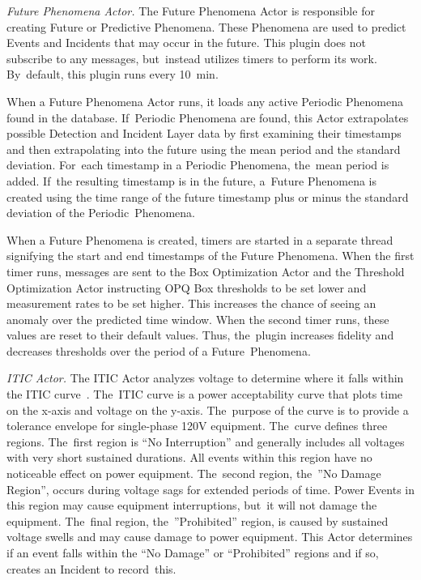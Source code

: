 \documentclass[energies,article,accept,moreauthors,pdftex]{Definitions/mdpi}
\begin{document}
{\em Future Phenomena Actor.} The Future Phenomena Actor is responsible for creating Future or Predictive Phenomena. These Phenomena are used to predict Events and Incidents that may occur in the future. This plugin does not subscribe to any messages, but~instead utilizes timers to perform its work. By~default, this plugin runs every 10~min.

When a Future Phenomena Actor runs, it loads any active Periodic Phenomena found in the database. If~Periodic Phenomena are found, this Actor extrapolates possible Detection and Incident Layer data by first examining their timestamps and then extrapolating into the future using the mean period and the standard deviation. For~each timestamp in a Periodic Phenomena, the~mean period is added. If~the resulting timestamp is in the future, a~Future Phenomena is created using the time range of the future timestamp plus or minus the standard deviation of the Periodic~Phenomena.

When a Future Phenomena is created, timers are started in a separate thread signifying the start and end timestamps of the Future Phenomena. When the first timer runs, messages are sent to the Box Optimization Actor and the Threshold Optimization Actor instructing OPQ Box thresholds to be set lower and measurement rates to be set higher. This increases the chance of seeing an anomaly over the predicted time window. When the second timer runs, these values are reset to their default values. Thus, the~plugin increases fidelity and decreases thresholds over the period of a Future~Phenomena.

{\em ITIC Actor.} The ITIC Actor analyzes voltage to determine where it falls within the ITIC curve~\cite{thallam_power_2000}. The~ITIC curve is a power acceptability curve that plots time on the x-axis and voltage on the y-axis. The~purpose of the curve is to provide a tolerance envelope for single-phase 120V equipment. The~curve defines three regions. The~first region is ``No Interruption'' and generally includes all voltages with very short sustained durations. All events within this region have no noticeable effect on power equipment. The~second region, the~''No Damage Region'', occurs during voltage sags for extended periods of time. Power Events in this region may cause equipment interruptions, but~it will not damage the equipment. The~final region, the~''Prohibited'' region, is caused by sustained voltage swells and may cause damage to power equipment. This Actor determines if an event falls within the ``No Damage'' or ``Prohibited'' regions and if so, creates an Incident to record~this.
\end{document}
